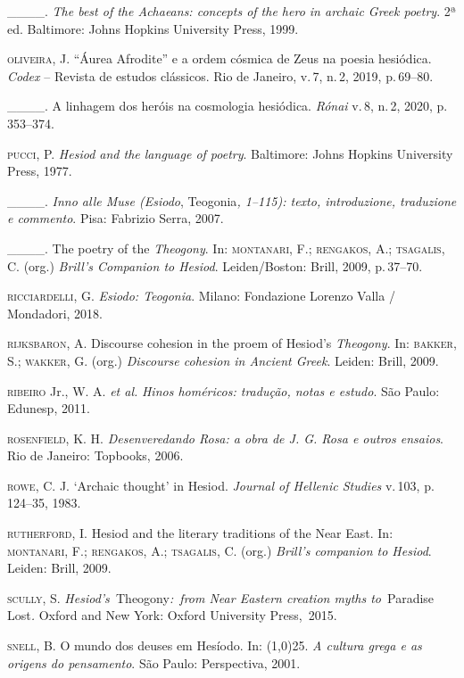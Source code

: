 \_\_\_\_. \textit{The best of the Achaeans: concepts of the hero in archaic Greek
poetry}. 2ª ed. Baltimore: Johns Hopkins University Press, 1999.

\textsc{oliveira}, J. ``Áurea Afrodite'' e a ordem cósmica de Zeus na poesia
hesiódica. \textit{Codex} -- Revista de estudos clássicos. Rio de Janeiro,
v.\,7, n.\,2, 2019, p.\,69--80.

\_\_\_\_. A linhagem dos heróis na cosmologia hesiódica. \textit{Rónai} v.\,8, n.\,2, 2020, p.\,353--374.

\textsc{pucci}, P. \textit{Hesiod and the language of poetry}. Baltimore: Johns
Hopkins University Press, 1977.

\_\_\_\_. \textit{Inno alle Muse (Esiodo}, Teogonia\textit{, 1--115): texto,
introduzione, traduzione e commento}. Pisa: Fabrizio Serra, 2007.

\_\_\_\_. The poetry of the \textit{Theogony}. In: \textsc{montanari}, F.; \textsc{rengakos}, A.;
\textsc{tsagalis}, C. (org.) \textit{Brill's Companion to Hesiod}. Leiden/Boston:
Brill, 2009, p.\,37--70.

\textsc{ricciardelli}, G. \textit{Esiodo: Teogonia}. Milano: Fondazione Lorenzo
Valla / Mondadori, 2018.

\textsc{rijksbaron}, A. Discourse cohesion in the proem of Hesiod's
\textit{Theogony}. In: \textsc{bakker}, S.; \textsc{wakker}, G. (org.) \textit{Discourse
cohesion in Ancient Greek}. Leiden: Brill, 2009.

\textsc{ribeiro} Jr., W. A. \textit{et al.} \textit{Hinos homéricos: tradução, notas
e estudo}. São Paulo: Edunesp, 2011.

\textsc{rosenfield}, K. H. \textit{Desenveredando Rosa: a obra de J. G. Rosa e
outros ensaios}. Rio de Janeiro: Topbooks, 2006.

\textsc{rowe}, C. J. `Archaic thought' in Hesiod. \textit{Journal of Hellenic
Studies} v.\,103, p.\,124--35, 1983.

\textsc{rutherford}, I. Hesiod and the literary traditions of the Near East. In:
\textsc{montanari}, F.; \textsc{rengakos}, A.; \textsc{tsagalis}, C. (org.) \textit{Brill's companion
to Hesiod}. Leiden: Brill, 2009.

\textsc{scully}, S. \textit{Hesiod's~}Theogony\textit{:~from Near Eastern
creation myths to}~Paradise Lost\textit{.} Oxford and New York: Oxford
University Press,~2015.

\textsc{snell}, B. O mundo dos deuses em Hesíodo. In: \line(1,0){25}. \textit{A cultura grega e
as origens do pensamento}. São Paulo: Perspectiva, 2001.

